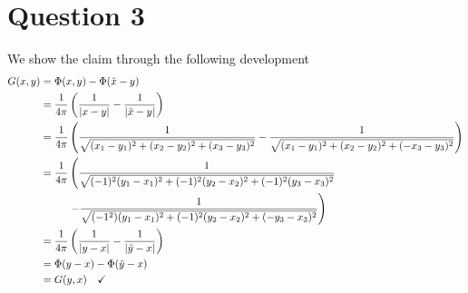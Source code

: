 \documentclass[12pt]{article}
\theoremstyle{definition}
\theoremstyle{definition}
\theoremstyle{definition}
\theoremstyle{definition}
\theoremstyle{definition}
\theoremstyle{example}
\theoremstyle{note}
\theoremstyle{remark}
\theoremstyle{example}
\begin{document}
		\section*{Question 3}
			We show the claim through the following development 
			\begin{align*}
				 G(x,y) &= \Phi(x,y) - \Phi(\tilde{x}-y) \\
				 &= \frac{1}{4\pi} \left(\frac{1}{\abs{x-y}} - \frac{1}{\abs{\tilde{x}-y}}\right) \\
				 &= \frac{1}{4\pi} \left(\frac{1}{\sqrt{(x_{1} -y_{1})^{2} +(x_{2} -y_{2})^{2} + (x_{3} -y_{3})^{2}}}-\frac{1}{\sqrt{(x_{1} -y_{1})^{2} +(x_{2} -y_{2})^{2} + (-x_{3} -y_{3})^{2}}}\right)\\
				&= \frac{1}{4\pi}
				 \begin{aligned}[t]
				  &\left(\frac{1}{\sqrt{(-1)^{2}(y_{1} -x_{1})^{2} +(-1)^{2}(y_{2} -x_{2})^{2} + (-1)^{2}(y_{3} -x_{3})^{2}}} \right. \\
				 	& \left. -\frac{1}{\sqrt{(-1^{2})(y_{1} -x_{1})^{2} +(-1)^{2}(y_{2} -x_{2})^{2} + (-y_{3} -x_{3})^{2}}} \right)
				 \end{aligned}\\
				 &= \frac{1}{4\pi} \left(\frac{1}{\abs{y-x}} - \frac{1}{\abs{\tilde{y}-x}}\right) \\
				 &= \Phi(y-x) - \Phi(\tilde{y}-x)\\
				 &= G(y,x) \quad \checkmark
			\end{align*}
	
\end{document}
